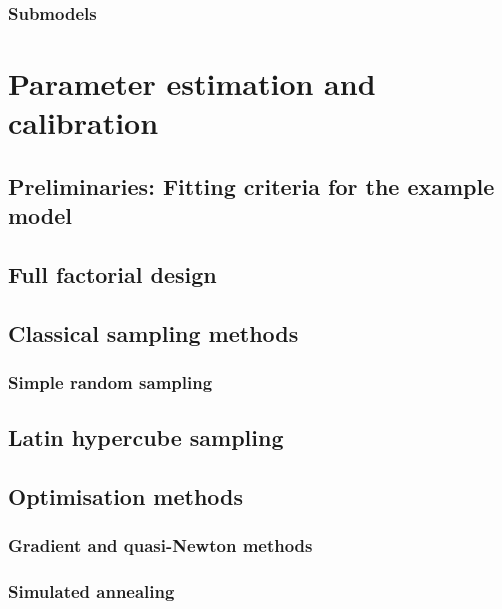\subsubsection{Submodels}
\label{thiele:intro:example:submodels}

\section{Parameter estimation and calibration}
\label{thiele:parameter_estimation}

\subsection{Preliminaries: Fitting criteria for the example model}
\label{thiele:parameter:prelims}

\subsection{Full factorial design}
\label{thiele:parameter:full}

\subsection{Classical sampling methods}
\label{thiele:parameter:classical}

\subsubsection{Simple random sampling}
\label{thiele:parameter:classical:simple}

\subsection{Latin hypercube sampling}
\label{thiele:parameter:latin}

\subsection{Optimisation methods}
\label{thiele:parameter:optimisation}

\subsubsection{Gradient and quasi-Newton methods}
\label{thiele:parameter:optimisation:gradient}

\subsubsection{Simulated annealing}
\label{thiele:parameter:optimisation:annealing}

